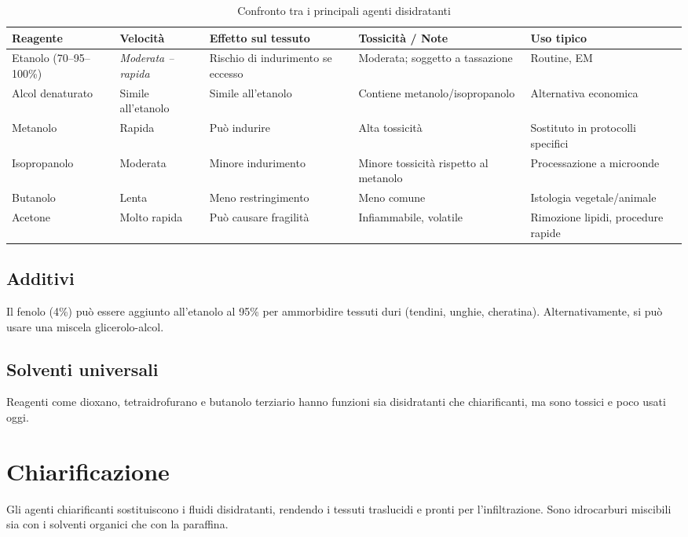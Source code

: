 \begin{table}[htbp]
  \centering
  \caption{Confronto tra i principali agenti disidratanti}
  \label{tab:disidratanti}
  \begin{adjustbox}{max width=\textwidth}
  \begin{tabular}{@{}lllll@{}}
    \toprule
    \textbf{Reagente} & \textbf{Velocità} & \textbf{Effetto sul tessuto} & \textbf{Tossicità / Note} & \textbf{Uso tipico} \\
    \midrule
    Etanolo (70--95--100\%) & \emph{Moderata -- rapida} & Rischio di indurimento se eccesso & Moderata; soggetto a tassazione & Routine, EM \\
    Alcol denaturato & Simile all'etanolo & Simile all'etanolo & Contiene metanolo/isopropanolo & Alternativa economica \\
    Metanolo & Rapida & Può indurire & Alta tossicità & Sostituto in protocolli specifici \\
    Isopropanolo & Moderata & Minore indurimento & Minore tossicità rispetto al metanolo & Processazione a microonde \\
    Butanolo & Lenta & Meno restringimento & Meno comune & Istologia vegetale/animale \\
    Acetone & Molto rapida & Può causare fragilità & Infiammabile, volatile & Rimozione lipidi, procedure rapide \\
    \bottomrule
  \end{tabular}
  \end{adjustbox}
\end{table}

\subsection{Additivi}
Il fenolo (4\%) può essere aggiunto all’etanolo al 95\% per ammorbidire tessuti duri (tendini, unghie, cheratina). Alternativamente, si può usare una miscela glicerolo-alcol.

\subsection{Solventi universali}
Reagenti come dioxano, tetraidrofurano e butanolo terziario hanno funzioni sia disidratanti che chiarificanti, ma sono tossici e poco usati oggi.



\section{Chiarificazione}
Gli agenti chiarificanti sostituiscono i fluidi disidratanti, rendendo i tessuti traslucidi e pronti per l’infiltrazione. Sono idrocarburi miscibili sia con i solventi organici che con la paraffina.

